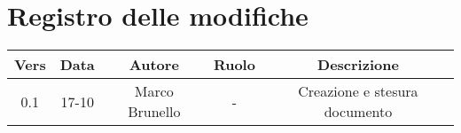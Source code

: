 \section{Registro delle modifiche}

\begin{table}[htbp]
	\begin{tabular}{|c|c|c|c|c|}
		\hline
		\rowcolor[gray]{0.9}
		Vers & Data & Autore & Ruolo & Descrizione \\
		\hline
		0.1 & 17-10 & Marco Brunello & - & Creazione e stesura documento \\
		\hline
	\end{tabular}
\end{table}